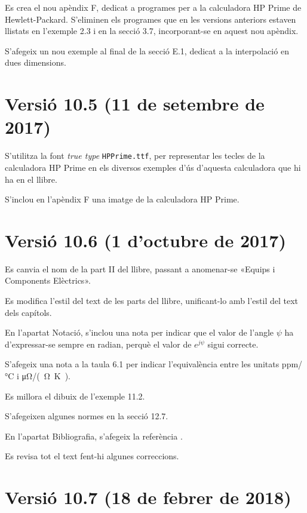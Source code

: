 Es crea el nou apèndix F, dedicat a programes per a la calculadora \textsf{HP Prime} de Hewlett-Packard. S'eliminen els programes que en les versions anteriors estaven llistats en l'exemple 2.3 i en la secció 3.7, incorporant-se en aquest nou apèndix.

S'afegeix un nou exemple al final de la secció E.1, dedicat  a la interpolació en dues dimensions.

\section*{Versió 10.5 (11 de setembre de 2017)}

S'utilitza la font \textit{true type} \texttt{HPPrime.ttf}, per representar les tecles de la calculadora \textsf{HP Prime} en els diversos exemples d'ús d'aquesta calculadora que hi ha en el llibre.

S'inclou en l'apèndix F una imatge de la calculadora \textsf{HP Prime}.


\section*{Versió 10.6 (1 d'octubre de 2017)}

Es canvia el nom de la part II del llibre, passant a anomenar-se «Equips i Components Elèctrics».

Es modifica l'estil del text de les parts del llibre, unificant-lo amb l'estil del text dels capítols.

En l'apartat Notació, s'inclou una nota per indicar  que el valor de l'angle $\psi$ ha d'expressar-se sempre en radian, perquè el valor de $e^{j\psi}$ sigui correcte.

S'afegeix una nota a la taula 6.1 per indicar l'equivalència entre les unitats \unit{ppm/\degreeCelsius}  i \unit{\micro\ohm/(\ohm.\kelvin)}.

Es millora el dibuix de l'exemple 11.2.

S’afegeixen algunes normes en la secció 12.7.

En l'apartat Bibliografia, s'afegeix la referència \cite{BUR}.

Es revisa tot el text fent-hi algunes correccions.


\section*{Versió 10.7 (18 de febrer de 2018)}

